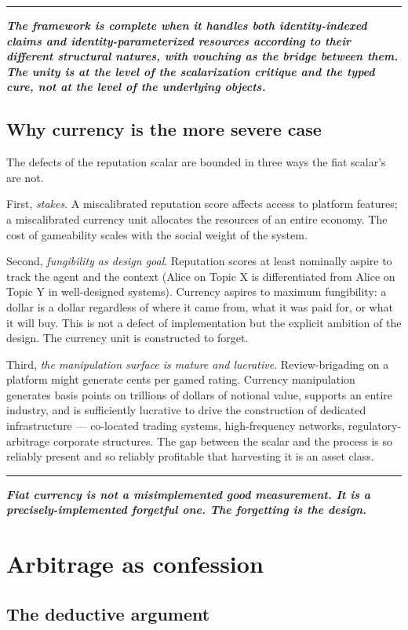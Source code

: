 \documentclass[11pt]{article}
\newcommand{\position}[1]{%
  \medskip
  \begin{quoting}[indentfirst=false, leftmargin=1em, rightmargin=1em]
  \noindent\textcolor{rhosky}{\rule{3pt}{1.2em}}\hspace{0.5em}\textbf{\textit{#1}}
  \end{quoting}
  \medskip
}
\begin{document}
\position{The framework is complete when it handles both identity-indexed claims and identity-parameterized resources according to their different structural natures, with vouching as the bridge between them. The unity is at the level of the scalarization critique and the typed cure, not at the level of the underlying objects.}

\subsection{Why currency is the more severe case}

The defects of the reputation scalar are bounded in three ways the fiat scalar's are not.

First, \emph{stakes}. A miscalibrated reputation score affects access to platform features; a miscalibrated currency unit allocates the resources of an entire economy. The cost of gameability scales with the social weight of the system.

Second, \emph{fungibility as design goal}. Reputation scores at least nominally aspire to track the agent and the context (Alice on Topic X is differentiated from Alice on Topic Y in well-designed systems). Currency aspires to maximum fungibility: a dollar is a dollar regardless of where it came from, what it was paid for, or what it will buy. This is not a defect of implementation but the explicit ambition of the design. The currency unit is constructed to forget.

Third, \emph{the manipulation surface is mature and lucrative}. Review-brigading on a platform might generate cents per gamed rating. Currency manipulation generates basis points on trillions of dollars of notional value, supports an entire industry, and is sufficiently lucrative to drive the construction of dedicated infrastructure --- co-located trading systems, high-frequency networks, regulatory-arbitrage corporate structures. The gap between the scalar and the process is so reliably present and so reliably profitable that harvesting it is an asset class.

\position{Fiat currency is not a misimplemented good measurement. It is a precisely-implemented forgetful one. The forgetting is the design.}

\section{Arbitrage as confession}

\subsection{The deductive argument}
\end{document}
